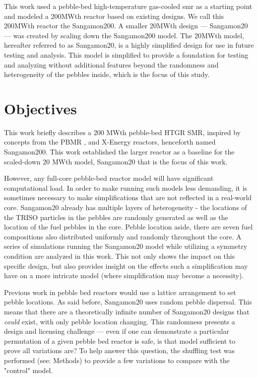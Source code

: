This work used a pebble-bed high-temperature gas-cooled \acrshort{smr} as a starting point and modeled a 200MWth reactor based on existing designs.  We call this 200MWth reactor the Sangamon200.  A smaller 20MWth design --- Sangamon20 --- was created by scaling down the Sangamon200 model.  The 20MWth model, hereafter referred to as Sangamon20, is a highly simplified design for use in future testing and analysis.  This model is simplified to provide a foundation for testing and analyzing without additional features beyond the randomness and heterogeneity of the pebbles inside, which is the focus of this study.


\section{Objectives}

This work briefly describes a 200 MWth pebble-bed HTGR SMR, inspired by concepts from the PBMR \cite{venter_pbmr_2005}, \cite{noauthor_pebble_2017} and X-Energy \cite{harlan_x-energy_2018} reactors, henceforth named Sangamon200.  This work established the larger reactor as a baseline for the scaled-down 20 MWth model, Sangamon20 that is the focus of this work.

However, any full-core pebble-bed reactor model will have significant computational load.  In order to make running such models less demanding, it is sometimes necessary to make simplifications that are not reflected in a real-world core.  Sangamon20 already has multiple layers of heterogeneity - the locations of the TRISO particles in the pebbles are randomly generated as well as the location of the fuel pebbles in the core.  Pebble location aside, there are seven fuel compositions also distributed uniformly and randomly throughout the core.  A series of simulations running the Sangamon20 model while utilizing a symmetry condition are analyzed in this work.  This not only shows the impact on this specific design, but also provides insight on the effects such a simplification may have on a more intricate model (where simplification may become a necessity).

Previous work in pebble bed reactors would use a lattice arrangement to set pebble locations.  As said before, Sangamon20 uses random pebble dispersal.  This means that there are a theoretically infinite number of Sangamon20 designs that \emph{could} exist, with only pebble location changing.  This randomness presents a design and licensing challenge --- even if one can demonstrate a particular permutation of a given pebble bed reactor is safe, is that model sufficient to prove all variations are?  To help answer this question, the shuffling test was performed (see: Methods) to provide a few variations to compare with the "control" model.

